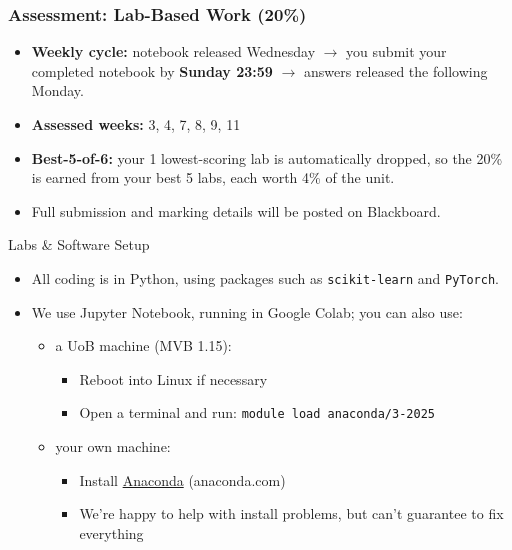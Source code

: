 \documentclass[10pt]{beamer}
\begin{document}
\begin{frame}[fragile]
\frametitle{Assessment: Lab-Based Work (20\%)}

\begin{itemize}
\item \textbf{Weekly cycle:} notebook released Wednesday $\to$ you submit
  your completed notebook by \textbf{Sunday 23:59} $\to$ answers released
  the following Monday.
\item \textbf{Assessed weeks:} 3, 4, 7, 8, 9, 11 
\item \textbf{Best-5-of-6:} your 1 lowest-scoring lab is automatically
  dropped, so the 20\% is earned from your best 5 labs, each worth 4\% of the unit.
\item Full submission and marking details will be posted on Blackboard.
\end{itemize}

\end{frame}
\begin{titledslide}{Labs \& Software Setup}

  \begin{itemize}
  \item All coding is in Python, using packages such as
    \texttt{scikit-learn} and \texttt{PyTorch}.
  \item We use Jupyter Notebook, running in Google Colab; you can also
    use:
    \begin{itemize}
    \item a UoB machine (MVB 1.15):
      \begin{itemize}
      \item Reboot into Linux if necessary
      \item Open a terminal and run: \texttt{module load anaconda/3-2025}
      \end{itemize}
    \item your own machine:
      \begin{itemize}
      \item Install \href{https://www.anaconda.com}{Anaconda}
        (anaconda.com)
      \item We're happy to help with install problems, but can't guarantee
        to fix everything
      \end{itemize}
    \end{itemize}
  \end{itemize}

\end{titledslide}
\end{document}
